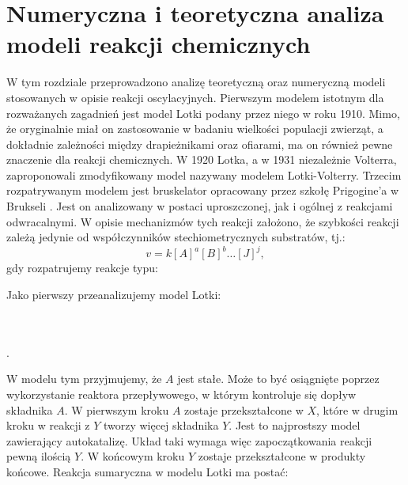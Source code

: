 \documentclass[10pt, a4paper, twoside, onecolumn]{article}
\numberwithin{equation}{section}
\begin{document}
	\section{Numeryczna i teoretyczna analiza modeli reakcji chemicznych}
	W tym rozdziale przeprowadzono analizę teoretyczną oraz numeryczną modeli stosowanych w opisie reakcji oscylacyjnych. Pierwszym modelem istotnym dla rozważanych zagadnień jest model Lotki podany przez niego w roku 1910. Mimo, że oryginalnie miał on zastosowanie w badaniu wielkości populacji zwierząt, a dokładnie zależności między drapieżnikami oraz ofiarami, ma on również pewne znaczenie dla reakcji chemicznych. W 1920 Lotka, a w 1931 niezależnie Volterra, zaproponowali zmodyfikowany model nazywany modelem Lotki-Volterry. Trzecim rozpatrywanym modelem jest bruskelator opracowany przez szkołę Prigogine'a w Brukseli \cite{prigogine}. Jest on analizowany w postaci uproszczonej, jak i ogólnej z reakcjami odwracalnymi. W opisie mechanizmów tych reakcji założono, że szybkości reakcji zależą jedynie od współczynników stechiometrycznych substratów, tj.:
	\begin{equation}
		v = k[A]^{a}[B]^{b}\ldots[J]^{j},
	\end{equation}
	gdy rozpatrujemy reakcje typu: 
	\begin{center}
	\end{center}\par
	Jako pierwszy przeanalizujemy model Lotki: 
	\begin{center}
		 \\
		 \\
		.
	\end{center}
	W modelu tym przyjmujemy, że \(A\) jest stałe. Może to być osiągnięte poprzez wykorzystanie reaktora przepływowego, w którym kontroluje się dopływ składnika \(A\). W pierwszym kroku \(A\) zostaje przekształcone w \(X\), które w drugim kroku w reakcji z \(Y\) tworzy więcej składnika \(Y\). Jest to najprostszy model zawierający autokatalizę. Układ taki wymaga więc zapoczątkowania reakcji pewną ilością \(Y\). W końcowym kroku \(Y\) zostaje przekształcone w produkty końcowe. Reakcja sumaryczna w modelu Lotki ma postać:
	\begin{center}
	\end{center}
\end{document}
